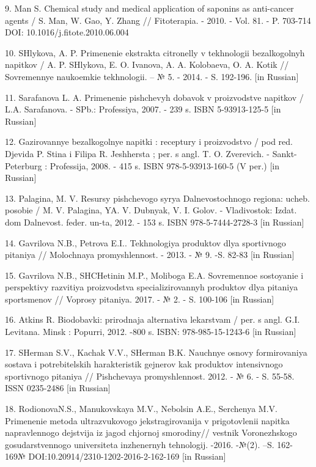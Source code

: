 9. Man S. Chemical study and medical application of saponins as
anti-cancer agents / S. Man, W. Gao, Y. Zhang // Fitoterapia. - 2010. -
Vol. 81. - P. 703-714 DOI: 10.1016/j.fitote.2010.06.004

10. SHlykova, A. P. Primenenie ekstrakta citronelly v tekhnologii
bezalkogol\textquotesingle nyh napitkov / A. P. SHlykova, E. O. Ivanova,
A. A. Kolobaeva, O. A. Kotik // Sovremennye naukoemkie tekhnologii. -- №
5. - 2014. - S. 192-196. {[}in Russian{]}

11. Sarafanova L. A. Primenenie pishchevyh dobavok v proizvodstve
napitkov / L.A. Sarafanova. - SPb.: Professiya, 2007. - 239 s. ISBN
5-93913-125-5 {[}in Russian{]}

12. Gazirovannye bezalkogol\textquotesingle nye napitki : receptury i
proizvodstvo / pod red. Djevida P. Stina i Filipa R. Jeshhersta ; per. s
angl. T. O. Zverevich. - Sankt-Peterburg : Professija, 2008. - 415 s.
ISBN 978-5-93913-160-5 (V per.) {[}in Russian{]}

13. Palagina, M. V. Resursy pishchevogo syr\textquotesingle ya
Dal\textquotesingle nevostochnogo regiona: ucheb. posobie / M. V.
Palagina, YA. V. Dubnyak, V. I. Golov. - Vladivostok: Izdat. dom
Dal\textquotesingle nevost. feder. un-ta, 2012. - 153 s. ISBN
978-5-7444-2728-3 {[}in Russian{]}

14. Gavrilova N.B., Petrova E.I.. Tekhnologiya produktov dlya
sportivnogo pitaniya // Molochnaya promyshlennost\textquotesingle. -
2013. - № 9. -S. 82-83 {[}in Russian{]}

15. Gavrilova N.B., SHCHetinin M.P., Moliboga E.A. Sovremennoe
sostoyanie i perspektivy razvitiya proizvodstva specializirovannyh
produktov dlya pitaniya sportsmenov // Voprosy pitaniya. 2017. - № 2. -
S. 100-106 {[}in Russian{]}

16. Atkins R. Biodobavki: prirodnaja al\textquotesingle ternativa
lekarstvam / per. s angl. G.I. Levitana. Minsk : Popurri, 2012. -800 s.
ISBN: 978-985-15-1243-6 {[}in Russian{]}

17. SHerman S.V., Kachak V.V., SHerman B.K. Nauchnye osnovy
formirovaniya sostava i potrebitel\textquotesingle skih harakteristik
gejnerov kak produktov intensivnogo sportivnogo pitaniya // Pishchevaya
promyshlennost\textquotesingle. 2012. - № 6. - S. 55-58. ISSN 0235-2486
{[}in Russian{]}

18. RodionovaN.S., Manukovskaya M.V., Nebol\textquotesingle sin A.E.,
Serchenya M.V. Primenenie metoda ul\textquotesingle trazvukovogo
jekstragirovanija v prigotovlenii napitka napravlennogo dejstvija iz
jagod chjornoj smorodiny// vestnik Voronezhskogo gosudarstvennogo
universiteta inzhenernyh tehnologij. -2016. -№(2). --S. 162-169№
DOI:10.20914/2310-1202-2016-2-162-169 {[}in Russian{]}

